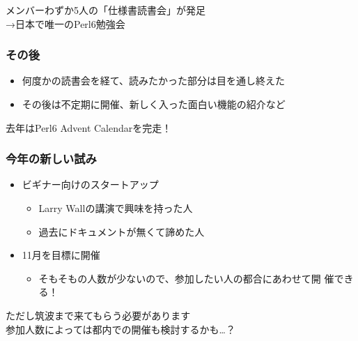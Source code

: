 \documentclass[14pt,dvipdfm,trans]{beamer}
\begin{document}
\begin{frame}
\begin{center}
 メンバーわずか5人の「仕様書読書会」が発足\\
\vspace{1zh}
\Large{→日本で唯一のPerl6勉強会}
\end{center}
 
\end{frame}

\begin{frame}
 \frametitle{その後}
\begin{itemize}
 \item 何度かの読書会を経て、読みたかった部分は目を通し終えた
 \item その後は不定期に開催、新しく入った面白い機能の紹介など
\end{itemize}
\end{frame}

\begin{frame}
  \begin{center}
  \Large{去年はPerl6 Advent Calendarを完走！}
 \end{center}

\end{frame}

\begin{frame}
\frametitle{今年の新しい試み}
\begin{itemize}
 \item ビギナー向けのスタートアップ
 \begin{itemize}
        \item Larry Wallの講演で興味を持った人
        \item 過去にドキュメントが無くて諦めた人
       \end{itemize}
\vspace{1zh}
 \item 11月を目標に開催
       \begin{itemize}
        \item そもそもの人数が少ないので、参加したい人の都合にあわせて開
              催できる！
       \end{itemize}
\end{itemize}
\end{frame}

\begin{frame}
 \begin{center}
  ただし筑波まで来てもらう必要があります\\
  \vspace*{3zh}
  \tiny{参加人数によっては都内での開催も検討するかも…？}
 \end{center}
\end{frame}
\end{document}
